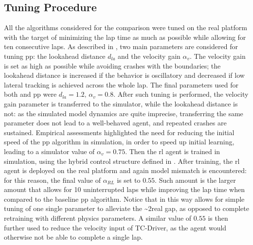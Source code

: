 \documentclass[letterpaper, conference]{IEEEtran}
\begin{document}
\subsection{Tuning Procedure}
All the algorithms considered for the comparison were tuned on the real platform with the target of minimizing the lap time as much as possible while allowing for ten consecutive laps.  
As described in , two main parameters are considered for tuning \gls{pp}: the lookahead distance $d_{la}$ and the velocity gain $\alpha_v$. 
The velocity gain is set as high as possible while avoiding crashes with the boundaries; the lookahead distance is increased if the behavior is oscillatory and decreased if low lateral tracking is achieved across the whole lap. The final parameters used for both {\namealgo} and \gls{pp} were $d_{la} = 1.2,\,\alpha_v=0.8$.
After such tuning is performed, the velocity gain parameter is transferred to the simulator, while the lookahead distance is not: as the simulated model dynamics are quite imprecise, transferring the same parameter does not lead to a well-behaved agent, and repeated crashes are sustained. 
Empirical assessments highlighted the need for reducing the initial speed of the \gls{pp} algorithm in simulation, in order to speed up initial learning, leading to a simulator value of $\alpha_v=0.75$.
Then the \gls{rl} agent is trained in simulation, using the hybrid control structure defined in .
After training, the \gls{rl} agent is deployed on the real platform and again model mismatch is encountered: for this reason, the final value of $\alpha_{RL}$ is set to $0.55$.
Such amount is the larger amount that allows for 10 uninterrupted laps while improving the lap time when compared to the baseline \gls{pp} algorithm.
Notice that in this way {\namealgo} allows for simple tuning of one single parameter to alleviate the \sim2real gap, as opposed to complete retraining with different physics parameters.
A similar value of $0.55$ is then further used to reduce the velocity input of TC-Driver, as the agent would otherwise not be able to complete a single lap.
\end{document}
